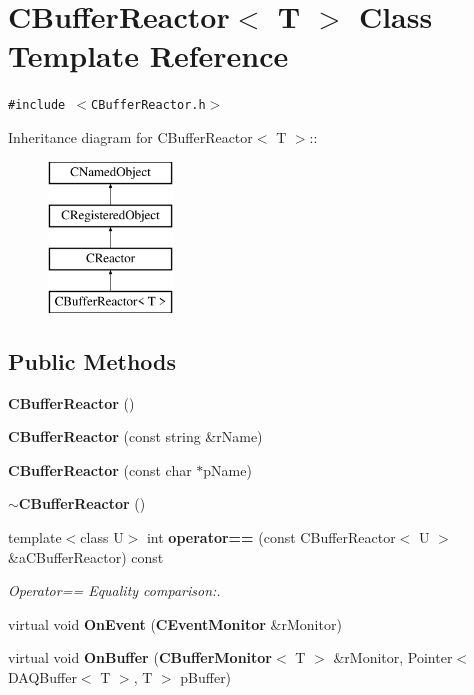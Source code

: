 \section{CBuffer\-Reactor$<$ T $>$  Class Template Reference}
\label{classCBufferReactor}
{\tt \#include $<$CBuffer\-Reactor.h$>$}

Inheritance diagram for CBuffer\-Reactor$<$ T $>$::\begin{figure}[H]
\begin{center}
\leavevmode
\includegraphics[height=4cm]{classCBufferReactor}
\end{center}
\end{figure}
\subsection*{Public Methods}
\begin{CompactItemize}
\item 
{\bf CBuffer\-Reactor} ()
\item 
{\bf CBuffer\-Reactor} (const string \&r\-Name)
\item 
{\bf CBuffer\-Reactor} (const char $\ast$p\-Name)
\item 
{\bf $\sim$CBuffer\-Reactor} ()
\item 
template$<$class U$>$ int {\bf operator==} (const CBuffer\-Reactor$<$ U $>$ \&a\-CBuffer\-Reactor) const
\begin{CompactList}\small\item\em Operator== Equality comparison:.\item\end{CompactList}\item 
virtual void {\bf On\-Event} ({\bf CEvent\-Monitor} \&r\-Monitor)
\item 
virtual void {\bf On\-Buffer} ({\bf CBuffer\-Monitor}$<$ T $>$ \&r\-Monitor, Pointer$<$ DAQBuffer$<$ T $>$, T $>$ p\-Buffer)
\end{CompactItemize}
